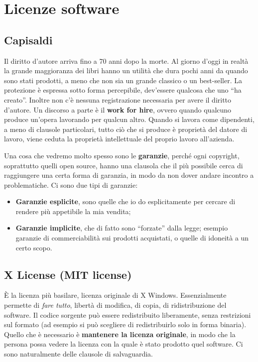 \chapter{Licenze software}

\section{Capisaldi}

Il diritto d'autore arriva fino a 70 anni dopo la morte. Al giorno d'oggi in realtà la grande maggioranza dei libri hanno un utilità che dura pochi anni da quando sono stati prodotti, a meno che non sia un grande classico o un best-seller. La protezione è espressa sotto forma percepibile, dev'essere qualcosa che uno ``ha creato''. Inoltre non c'è nessuna registrazione necessaria per avere il diritto d'autore. Un discorso a parte è il \textbf{work for hire}, ovvero quando qualcuno produce un'opera lavorando per qualcun altro. Quando si lavora come dipendenti, a meno di clausole particolari, tutto ciò che si produce è proprietà del datore di lavoro, viene ceduta la proprietà intellettuale del proprio lavoro all'azienda.  

Una cosa che vedremo molto spesso sono le \textbf{garanzie}, perché ogni copyright, soprattutto quelli open source, hanno una clausola che il più possibile cerca di raggiungere una certa forma di garanzia, in modo da non dover andare incontro a problematiche. Ci sono due tipi di garanzie:

\begin{itemize}

\item \textbf{Garanzie esplicite}, sono quelle che io do esplicitamente per cercare di rendere più appetibile la mia vendita; 

\item \textbf{Garanzie implicite}, che di fatto sono ``forzate'' dalla legge; esempio garanzie di commerciabilità sui prodotti acquistati, o quelle di idoneità a un certo scopo.

\end{itemize}

\section{X License (MIT license)}

È la licenza più basilare, licenza originale di X Windows. Essenzialmente permette di \textit{fare tutto}, libertà di modifica, di copia, di ridistribuzione del software. Il codice sorgente può essere redistribuito liberamente, senza restrizioni sul formato (ad esempio si può scegliere di redistribuirlo solo in forma binaria). Quello che è necessario è \textbf{mantenere la licenza originale}, in modo che la persona possa vedere la licenza con la quale è stato prodotto quel software. Ci sono naturalmente delle clausole di salvaguardia. 	

